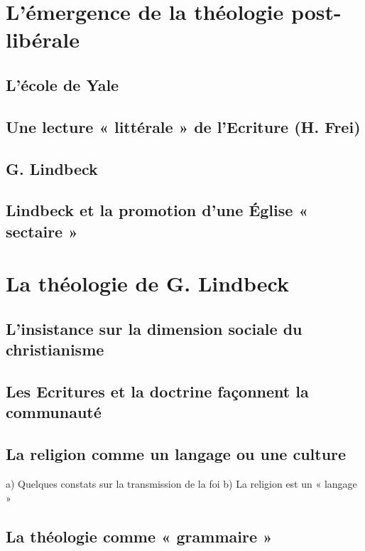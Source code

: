 \section{L’émergence de la théologie post-libérale}

\subsection{L’école de Yale}
\subsection{Une lecture « littérale » de l’Ecriture (H. Frei)}
\subsection{G. Lindbeck}
\subsection{Lindbeck et la promotion d’une Église « sectaire »}
 

\section{La théologie de G. Lindbeck}
 \subsection{L’insistance sur la dimension sociale du christianisme}
 \subsection{Les Ecritures et la doctrine façonnent la communauté}
  \subsection{La religion comme un langage ou une culture}
 
a) Quelques constats sur la transmission de la foi
b) La religion est un « langage »

 \subsection{La théologie comme « grammaire »}
 